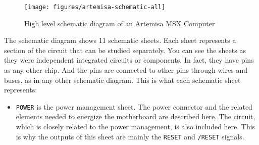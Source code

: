 \begin{figure}
  \centering
  \texttt{[image: figures/artemisa-schematic-all]}
  \caption{High level schematic diagram of an Artemisa MSX Computer}
  \label{fig:artemisa-arch-overview}
\end{figure}

The schematic diagram shows 11 schematic sheets. Each sheet represents a section of the circuit that can be studied separately. You can see the sheets as they were independent integrated circuits or components. In fact, they have pins as any other chip. And the pins are connected to other pins through wires and buses, as in any other schematic diagram. This is what each schematic sheet represents:

\begin{itemize}
  \item {\tt POWER} is the power management sheet. The power connector and the related elements needed to energize the motherboard are described here. The  circuit, which is closely related to the power management, is also included here. This is why the outputs of this sheet are mainly the {\tt RESET} and {\tt /RESET} signals.
\end{itemize}

